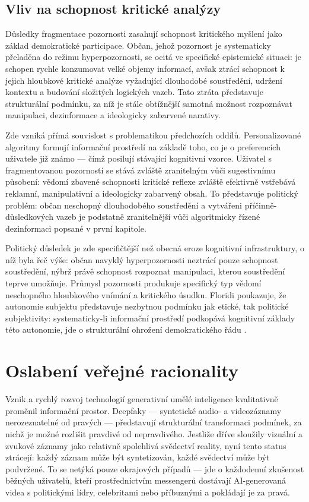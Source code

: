 \subsection{Vliv na schopnost kritické analýzy}

Důsledky fragmentace pozornosti zasahují schopnost kritického myšlení jako základ demokratické participace.
Občan, jehož pozornost je systematicky přeladěna do režimu hyperpozornosti, se ocitá ve specifické epistemické situaci: je schopen rychle konzumovat velké objemy informací, avšak ztrácí schopnost k jejich hloubkové kritické analýze vyžadující dlouhodobé soustředění, udržení kontextu a budování složitých logických vazeb. Tato ztráta představuje strukturální podmínku, za níž je stále obtížnější samotná možnost rozpoznávat manipulaci, dezinformace a ideologicky zabarvené narativy.

Zde vzniká přímá souvislost s problematikou předchozích oddílů.
Personalizované algoritmy formují informační prostředí na základě toho, co je o preferencích uživatele již známo — čímž posilují stávající kognitivní vzorce.
Uživatel s fragmentovanou pozorností se stává zvláště zranitelným vůči sugestivnímu působení: vědomí zbavené schopnosti kritické reflexe zvláště efektivně vstřebává reklamní, manipulativní a ideologicky zabarvený obsah.
To představuje politický problém: občan neschopný dlouhodobého soustředění a vytvářeni příčinně-důsledkových vazeb je podstatně zranitelnější vůči algoritmicky řízené dezinformaci popsané v první kapitole.

Politický důsledek je zde specifičtější než obecná eroze kognitivní infrastruktury, o níž byla řeč výše: občan navyklý hyperpozornosti neztrácí pouze schopnost soustředění, nýbrž právě schopnost rozpoznat manipulaci, kterou soustředění teprve umožňuje.
Průmysl pozornosti produkuje specifický typ vědomí neschopného hloubkového vnímání a kritického úsudku.
Floridi poukazuje, že autonomie subjektu představuje nezbytnou podmínku jak etické, tak politické subjektivity: systematicky-li informační prostředí podkopává kognitivní základy této autonomie, jde o strukturální ohrožení demokratického řádu \parencite{Floridi23}.

\section{Oslabení veřejné racionality}

Vznik a rychlý rozvoj technologií generativní umělé inteligence kvalitativně proměnil informační prostor. Deepfaky — syntetické audio- a videozáznamy nerozeznatelné od pravých — představují strukturální transformaci podmínek, za nichž je možné rozlišit pravdivé od nepravdivého. Jestliže dříve sloužily vizuální a zvukové záznamy jako relativně spolehlivá svědectví reality, nyní tento status ztrácejí: každý záznam může být syntetizován, každé svědectví může být podvržené. To se netýká pouze okrajových případů — jde o každodenní zkušenost běžných uživatelů, kteří prostřednictvím messengerů dostávají AI-generovaná videa s politickými lídry, celebritami nebo příbuznými a pokládají je za pravá.

